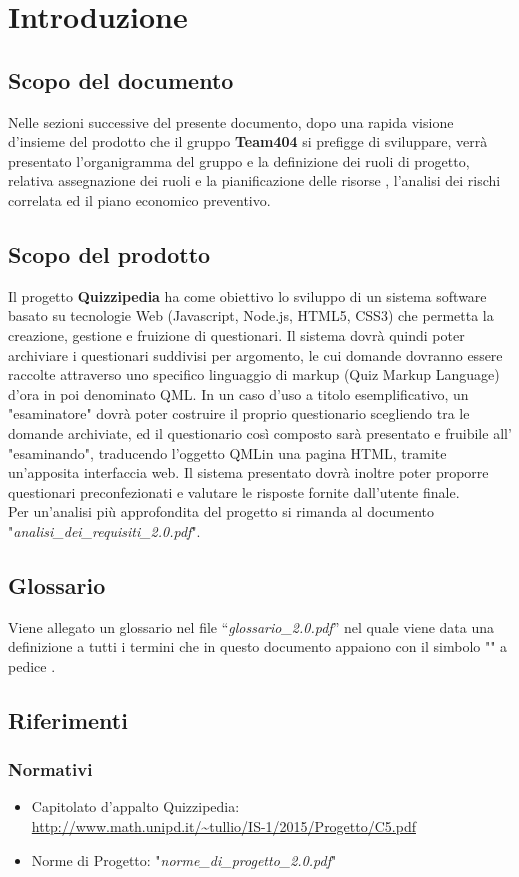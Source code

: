 \documentclass[a4paper,11pt]{article}
\begin{document}
	\newpage
	\section{Introduzione}
	\subsection{Scopo del documento}
	Nelle sezioni successive del presente documento, dopo una rapida visione d'insieme del prodotto che il gruppo \textbf{Team404} si prefigge di sviluppare, verrà presentato l'organigramma del gruppo e la definizione dei ruoli di progetto, relativa assegnazione dei ruoli e la pianificazione delle risorse , l'analisi dei rischi correlata ed il piano economico preventivo.
	\subsection{Scopo del prodotto}
	Il progetto \textbf{Quizzipedia} ha come obiettivo lo sviluppo di un sistema software basato su tecnologie Web (Javascript\addglos, Node.js\addglos, HTML5\addglos, CSS3\addglos) che permetta la creazione, gestione e fruizione di questionari. Il sistema dovrà quindi poter archiviare i questionari suddivisi per argomento, le cui domande dovranno essere raccolte attraverso uno specifico linguaggio di markup (Quiz Markup Language) d'ora in poi denominato QML\addglos. In un caso d'uso a titolo esemplificativo, un "esaminatore" dovrà poter costruire il proprio questionario scegliendo tra le domande archiviate, ed il questionario così composto sarà presentato e fruibile all' "esaminando", traducendo l'oggetto QML\addglos in una pagina HTML\addglos, tramite un'apposita interfaccia web. Il sistema presentato dovrà inoltre poter proporre questionari preconfezionati e valutare le risposte fornite dall'utente finale.
	\\
	Per un'analisi più approfondita del progetto si rimanda al documento "\textit{analisi\_dei\_requisiti\_2.0.pdf}".
	\subsection{Glossario}
	Viene allegato un glossario nel file ``\textit{glossario\_2.0.pdf}'' nel quale viene data una definizione a tutti i termini che in questo documento appaiono con il simbolo "\addglos" a pedice .
	\subsection{Riferimenti}
		\subsubsection{Normativi}
		\begin{itemize}
			\item Capitolato d'appalto Quizzipedia:\\
			\url{http://www.math.unipd.it/~tullio/IS-1/2015/Progetto/C5.pdf}
			\item Norme di Progetto: "\textit{norme\_di\_progetto\_2.0.pdf}"
		\end{itemize}
\end{document}
